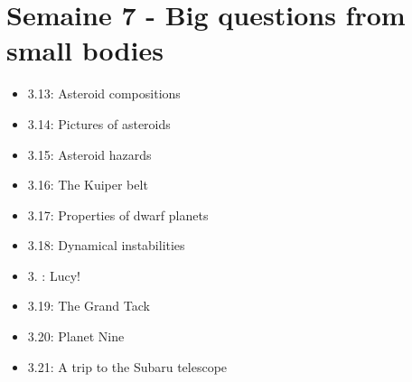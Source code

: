 \newpage 

\section*{Semaine 7 - Big questions from small bodies}


\begin{itemize}[label={$\bullet$}]
    \item 3.13: Asteroid compositions
    \item 3.14: Pictures of asteroids
    \item 3.15: Asteroid hazards
    \item 3.16: The Kuiper belt
    \item 3.17: Properties of dwarf planets
    \item 3.18: Dynamical instabilities
    \item 3.  : Lucy!
    \item 3.19: The Grand Tack
    \item 3.20: Planet Nine
    \item 3.21:  A trip to the Subaru telescope
\end{itemize}

\newpage 


